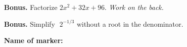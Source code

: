 \documentclass[12pt]{exam}
\begin{document}
\begin{questions}

\vfill

\question \textbf{Bonus.} Factorize $2x^2 + 32x + 96$. \hfill \emph{Work on the back.}

\question \textbf{Bonus.} Simplify $\,\, \displaystyle 2^{-1/3}$ without a root in the denominator.


\end{questions}

\begin{tcolorbox}

\textbf{Name of marker:}

\begin{center}
\gradetable[h][questions]
\end{center}

\end{tcolorbox}
\end{document}
